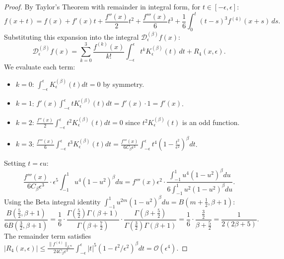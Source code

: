 \documentclass[11pt,a4paper]{article}
\theoremstyle{definition}
\begin{document}
\begin{proof}
By Taylor's Theorem with remainder in integral form, for $t \in [-\epsilon, \epsilon]$:
\begin{equation}
f(x + t) = f(x) + f'(x) t + \frac{f''(x)}{2} t^2 + \frac{f'''(x)}{6} t^3 + \frac{1}{6} \int_0^t (t - s)^3 f^{(4)}(x + s) \, ds.
\end{equation}
Substituting this expansion into the integral $\mathcal{D}_\epsilon^{(\beta)} f(x)$:
\begin{equation}
\mathcal{D}_\epsilon^{(\beta)} f(x) = \sum_{k=0}^3 \frac{f^{(k)}(x)}{k!} \int_{-\epsilon}^{\epsilon} t^k K_\epsilon^{(\beta)}(t) \, dt + R_4(x, \epsilon).
\end{equation}
We evaluate each term:
\begin{itemize}
    \item $k = 0$: $\int_{-\epsilon}^{\epsilon} K_\epsilon^{(\beta)}(t) dt = 0$ by symmetry.
    \item $k = 1$: $f'(x) \int_{-\epsilon}^{\epsilon} t K_\epsilon^{(\beta)}(t) dt = f'(x) \cdot 1 = f'(x)$.
    \item $k = 2$: $\frac{f''(x)}{2} \int_{-\epsilon}^{\epsilon} t^2 K_\epsilon^{(\beta)}(t) dt = 0$ since $t^2 K_\epsilon^{(\beta)}(t)$ is an odd function.
    \item $k = 3$: $\frac{f'''(x)}{6} \int_{-\epsilon}^{\epsilon} t^3 K_\epsilon^{(\beta)}(t) dt = \frac{f'''(x)}{6 C_\beta \epsilon^3} \int_{-\epsilon}^{\epsilon} t^4 \left(1 - \frac{t^2}{\epsilon^2}\right)^\beta dt$.
\end{itemize}
Setting $t = \epsilon u$:
\begin{equation}
\frac{f'''(x)}{6 C_\beta \epsilon^3} \cdot \epsilon^5 \int_{-1}^1 u^4 (1 - u^2)^\beta du = f'''(x) \epsilon^2 \cdot \frac{\int_{-1}^1 u^4 (1 - u^2)^\beta du}{6 \int_{-1}^1 u^2 (1 - u^2)^\beta du}.
\end{equation}
Using the Beta integral identity $\int_{-1}^1 u^{2m} (1 - u^2)^\beta du = B(m + \frac{1}{2}, \beta + 1)$:
\begin{equation}
\frac{B\left(\frac{5}{2}, \beta + 1\right)}{6 B\left(\frac{3}{2}, \beta + 1\right)} = \frac{1}{6} \cdot \frac{\Gamma\left(\frac{5}{2}\right)\Gamma(\beta + 1)}{\Gamma\left(\beta + \frac{7}{2}\right)} \cdot \frac{\Gamma\left(\beta + \frac{5}{2}\right)}{\Gamma\left(\frac{3}{2}\right)\Gamma(\beta + 1)} = \frac{1}{6} \cdot \frac{\frac{3}{2}}{\beta + \frac{5}{2}} = \frac{1}{2(2\beta + 5)}.
\end{equation}
The remainder term satisfies $|R_4(x, \epsilon)| \le \frac{\|f^{(4)}\|_{L^\infty}}{24 C_\beta \epsilon^3} \int_{-\epsilon}^\epsilon |t|^5 (1 - t^2/\epsilon^2)^\beta dt = \mathcal{O}(\epsilon^4)$.
\end{proof}
\end{document}
